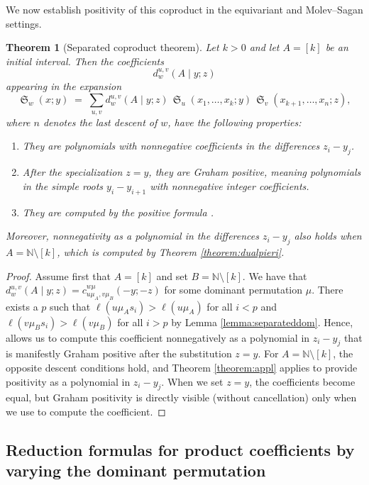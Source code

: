 \documentclass{amsart}
\newtheorem{theorem}{Theorem}[section]
\theoremstyle{definition}
\theoremstyle{remark}
\numberwithin{equation}{subsection}
\DeclareMathOperator{\sch}{\mathfrak{S}}
\newcommand{\cpcf}[5]{d^{#1,#2}_{#3}\left(#4\mid #5\right)}
\begin{document}
We now establish positivity of this coproduct in the equivariant and Molev--Sagan settings.

\begin{theorem}[Separated coproduct theorem]
Let $k>0$ and let $A=[k]$ be an initial interval. Then the coefficients
\[
\cpcf{u}{v}{w}{A}{y;z}
\]
appearing in the expansion
\[
\sch_w(x;y) \;=\; \sum_{u,v} \cpcf{u}{v}{w}{A}{y;z}\,
   \sch_u(x_{1},\ldots,x_k;y)\,
   \sch_v(x_{k+1},\ldots,x_n;z),
\]
where $n$ denotes the last descent of $w$, have the following properties:
\begin{enumerate}
\item They are polynomials with nonnegative coefficients in the differences $z_i-y_j$.
\item After the specialization $z=y$, they are Graham positive, meaning polynomials in the simple roots $y_i-y_{i+1}$ with nonnegative integer coefficients.  
\item They are computed by the positive formula \cite[Theorem~3.1]{samuelmolev}.
\end{enumerate}
Moreover, nonnegativity as a polynomial in the differences $z_i-y_j$ also holds when $A=\mathbb{N}\setminus[k]$, which is computed by Theorem \ref{theorem:dualpieri}.

\end{theorem}

\begin{proof}

Assume first that $A=[k]$ and set $B=\mathbb{N}\setminus [k]$. We have that $\cpcf{u}{v}{w}{A}{y;z}=c_{u\mu_A,v\mu_B}^{w\mu}(-y;-z)$ for some dominant permutation $\mu$. There exists a $p$ such that $\ell(u\mu_As_i)>\ell(u\mu_A)$ for all $i<p$ and $\ell(v\mu_Bs_i)>\ell(v\mu_B)$ for all $i>p$ by Lemma \ref{lemma:separateddom}. Hence, \cite[Theorem~3.1]{samuelmolev} allows us to compute this coefficient nonnegatively as a polynomial in $z_i-y_j$ that is manifestly Graham positive after the substitution $z=y$. For $A=\mathbb{N}\setminus [k]$, the opposite descent conditions hold, and Theorem \ref{theorem:appl} applies to provide positivity as a polynomial in $z_i-y_j$. When we set $z=y$, the coefficients become equal, but Graham positivity is directly visible (without cancellation) only when we use \cite[Theorem~3.1]{samuelmolev} to compute the coefficient.
\end{proof}


\subsection{Reduction formulas for product coefficients by varying the dominant permutation}
\end{document}
